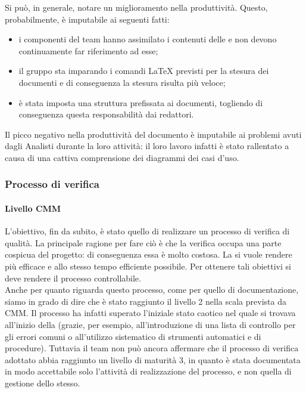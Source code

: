 				Si può, in generale, notare un miglioramento nella produttività. Questo, probabilmente, è imputabile ai seguenti fatti:
				\begin{itemize}
					\item i componenti del team hanno assimilato i contenuti delle  e non devono continuamente far 
					riferimento ad esse;
					\item il gruppo sta imparando i comandi \LaTeX{} previsti per la stesura dei documenti e di conseguenza la stesura risulta più veloce;
					\item è stata imposta una struttura prefissata ai documenti, togliendo di conseguenza questa responsabilità dai redattori.
				\end{itemize}
				Il picco negativo nella produttività del documento  è imputabile ai problemi avuti dagli Analisti durante 
				la loro attività: il loro lavoro infatti è stato rallentato a causa di una cattiva comprensione dei diagrammi dei casi d'uso.
		\subsubsection{Processo di verifica}
			\paragraph{Livello CMM}
				L'obiettivo, fin da subito, è stato quello di realizzare un processo di verifica di qualità. La principale ragione per fare ciò è che la 
				verifica occupa una parte cospicua del progetto: di conseguenza essa è molto costosa. La si vuole rendere più efficace e allo stesso 
				tempo efficiente possibile. Per ottenere tali obiettivi si deve rendere il processo controllabile.\\
				Anche per quanto riguarda questo processo, come per quello di documentazione, siamo in grado di dire che è stato raggiunto il livello 2 
				nella scala prevista da CMM. Il processo ha infatti superato l'iniziale stato caotico nel quale si trovava all'inizio della 
				(grazie, per esempio, all'introduzione di una lista di controllo per gli errori comuni o all'utilizzo sistematico di strumenti 
				automatici e di procedure). Tuttavia il team non può ancora affermare che il processo di verifica adottato abbia raggiunto un livello di 
				maturità 3, in quanto è stata documentata in modo accettabile solo l'attività di realizzazione del processo, e non quella di gestione 
				dello stesso.
